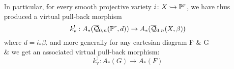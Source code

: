 In particular, for every smooth projective variety $i\colon X\hookrightarrow\mathbb P^r$, we have thus produced a virtual pull-back morphism
\begin{equation*} k^!_{\text{v}} : A_*(\overline{\mathcal Q}_{0,n}(\mathbb P^r,d)) \rightarrow A_*(\overline{\mathcal Q}_{0,n}(X,\beta)) \end{equation*}
where $d=i_*\beta$, and more generally for any cartesian diagram
\bcd
F \ar[r] \ar[d]  & G \ar[d] \\
 \ar[r,"k"] & 
\ecd
we get an associated virtual pull-back morphism:
\begin{equation*} k^!_{\text{v}} : A_*(G) \to A_*(F) \end{equation*}